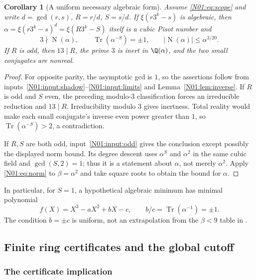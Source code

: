 \documentclass[11pt,a4paper]{article}
\newtheorem{corollary}[theorem]{Corollary}\newtheorem{mainthm}[theorem]{Theorem}
\theoremstyle{definition}\newtheorem{definition}[theorem]{Definition}
\theoremstyle{remark}\newtheorem{remark}[theorem]{Remark}
\DeclareMathOperator{\Tr}{Tr}\DeclareMathOperator{\tr}{tr}\DeclareMathOperator{\Nm}{N}
\begin{document}
\begin{corollary}[A uniform necessary algebraic form]\label{N01:cor:form}
Assume \eqref{N01:eq:scope} and write $d=\gcd(r,s)$, $R=r/d$, $S=s/d$.
If $\xi(r3^k-s)$ is algebraic, then
$\alpha=\xi(r3^k-s)^d=\xi(R3^k-S)$ itself is a cubic Pisot number and
\begin{equation}\label{N01:eq:necessary}
 3\nmid\Nm(\alpha),\qquad
 \Tr(\alpha^{-S})=\pm1,\qquad
 |\Nm(\alpha)|\le\alpha^{3/20}.
\end{equation}
If $R$ is odd, then $13\mid R$, the prime $3$ is inert in $\Q(\alpha)$,
and the two small conjugates are nonreal.
\end{corollary}
\begin{proof}
For opposite parity, the asymptotic gcd is $1$, so the assertions
follow from inputs~\ref{N01:input:shadow}--\ref{N01:input:limits} and
Lemma~\ref{N01:lem:inverse}. If $R$ is odd and $S$ even, the preceding
modulo-$3$ classification forces an irreducible reduction and
$13\mid R$. Irreducibility modulo $3$ gives inertness. Total reality
would make each small conjugate's inverse even power greater than
$1$, so $\Tr(\alpha^{-S})>2$, a contradiction.

If $R,S$ are both odd, input~\ref{N01:input:odd} gives the conclusion
except possibly the displayed norm bound. Its degree descent uses
$\alpha^S$ and $\alpha^2$ in the same cubic field and $\gcd(S,2)=1$;
thus it is a statement about $\alpha$, not merely $\alpha^2$.
Apply \eqref{N01:eq:norm} to $\beta=\alpha^2$ and take square roots to
obtain the bound for $\alpha$.
\end{proof}

In particular, for $S=1$, a hypothetical algebraic minimum has
minimal polynomial
\begin{equation}\label{N01:eq:polynomial}
 f(X)=X^3-aX^2+bX-c,\qquad b/c=\Tr(\alpha^{-1})=\pm1.
\end{equation}
The condition $b=\pm c$ is uniform, not an extrapolation from the
$\beta<9$ table in \cite{K064}.

\subsection{Finite ring certificates and the global cutoff}

\subsubsection{The certificate implication}
\end{document}
